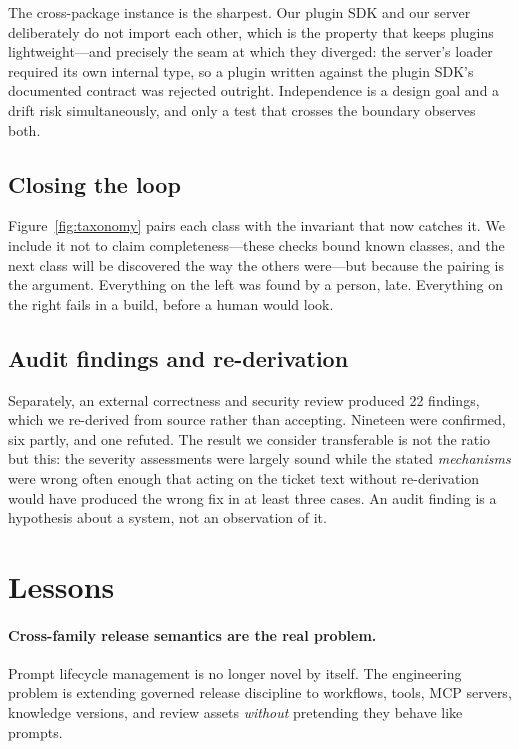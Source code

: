 \documentclass{article}
\begin{document}
The cross-package instance is the sharpest. Our plugin SDK and our server
deliberately do not import each other, which is the property that keeps plugins
lightweight---and precisely the seam at which they diverged: the server's loader
required its own internal type, so a plugin written against the plugin SDK's
documented contract was rejected outright. Independence is a design goal and a
drift risk simultaneously, and only a test that crosses the boundary observes both.

\subsection{Closing the loop}

Figure~\ref{fig:taxonomy} pairs each class with the invariant that now catches it.
We include it not to claim completeness---these checks bound known classes, and the
next class will be discovered the way the others were---but because the pairing is
the argument. Everything on the left was found by a person, late. Everything on the
right fails in a build, before a human would look.

\subsection{Audit findings and re-derivation}

Separately, an external correctness and security review produced 22 findings, which
we re-derived from source rather than accepting. Nineteen were confirmed, six
partly, and one refuted. The result we consider transferable is not the ratio but
this: the severity assessments were largely sound while the stated \emph{mechanisms}
were wrong often enough that acting on the ticket text without re-derivation would
have produced the wrong fix in at least three cases. An audit finding is a
hypothesis about a system, not an observation of it.

\section{Lessons}

\paragraph{Cross-family release semantics are the real problem.}
Prompt lifecycle management is no longer novel by itself. The engineering problem is
extending governed release discipline to workflows, tools, MCP servers, knowledge
versions, and review assets \emph{without} pretending they behave like prompts.
\end{document}
